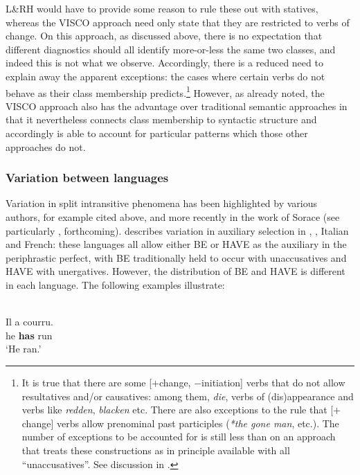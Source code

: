 \documentclass[output=paper]{langsci/langscibook}
\begin{document}
\ea
    \z
\z
L\&RH would have to provide some reason to rule these out with statives,
whereas the VISCO approach need only state that they are restricted to verbs of
change. On this approach, as discussed above, there is no expectation that
different  diagnostics should all identify more-or-less the
same two classes, and indeed this is not what we observe. Accordingly, there is
a reduced need to explain away the apparent exceptions: the cases where certain
verbs do not behave as their class membership predicts.\footnote{It is true
that there are some [$+$change, $-$initiation] verbs that do not allow
resultatives and/or causatives: among them, \emph{die}, verbs of
(dis)appearance and verbs like \emph{redden}, \emph{blacken} etc. There are
also exceptions to the rule that [$+$change] verbs allow prenominal past
participles (\emph{*the gone man}, etc.). The number of exceptions to be
accounted for is still less than on an approach that treats these constructions
as in principle available with all \enquote{unaccusatives}. See discussion in
\textcite{Baker2018,Baker2019}.}  However, as already noted, the VISCO approach also
has the advantage over traditional semantic approaches in that it nevertheless
connects class membership to syntactic structure and accordingly is able to
account for particular patterns which those other approaches do not.

\subsubsection{Variation between languages}

Variation in split intransitive phenomena has been highlighted by various
authors, for example \citet{Rosen1984} cited above, and more recently in the
work of Sorace (see particularly \citealt{Sorace2000}, forthcoming).
\citet{Sorace2000} describes variation in auxiliary selection in , ,
Italian and French: these languages all allow either BE or HAVE as the
auxiliary in the periphrastic perfect, with BE traditionally held to occur with
unaccusatives and HAVE with unergatives. However, the distribution of BE and
HAVE is different in each language. The following examples illustrate:

\ea {}\\
    \sn
    \gll Il a courru.\\
        he \textbf{has} run\\
    \glt \enquote*{He ran.}
\z
\end{document}
